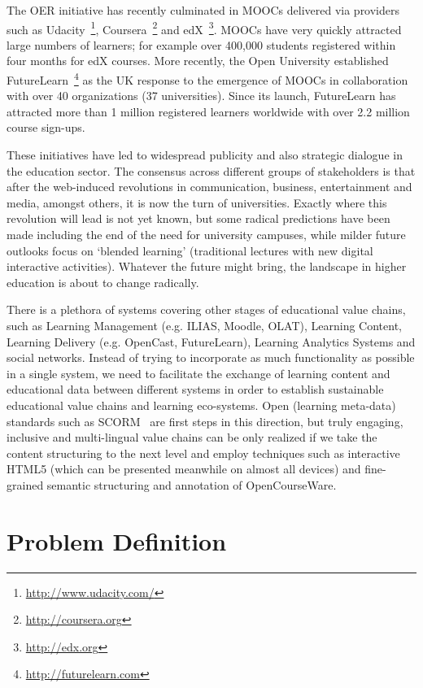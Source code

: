 \documentclass[ngerman,UKenglish,table]{scrbook}
\begin{document}
The OER initiative has recently culminated in MOOCs delivered via providers such as Udacity~\footnote{\url{http://www.udacity.com/}}, Coursera~\footnote{\url{http://coursera.org}} and edX~\footnote{\url{http://edx.org}}.
MOOCs have very quickly attracted large numbers of learners; for example over 400,000 students registered within four months for edX courses.
More recently, the Open University established FutureLearn~\footnote{\url{http://futurelearn.com}} as the UK response to the emergence of MOOCs in collaboration with over 40 organizations (37 universities).
Since its launch, FutureLearn has attracted more than 1 million registered learners worldwide with over 2.2 million course sign-ups. 

These initiatives have led to widespread publicity and also strategic dialogue in the education sector.
The consensus across different groups of stakeholders is that after the web-induced revolutions in communication, business, entertainment and media, amongst others, it is now the turn of universities.
Exactly where this revolution will lead is not yet known, but some radical predictions have been made including the end of the need for university campuses, while milder future outlooks focus on ‘blended learning’ (traditional lectures with new digital interactive activities).
Whatever the future might bring, the landscape in higher education is about to change radically.

There is a plethora of systems covering other stages of educational value chains, such as Learning Management (e.g. ILIAS, Moodle, OLAT), Learning Content, Learning Delivery (e.g. OpenCast, FutureLearn), Learning Analytics Systems and social networks.
Instead of trying to incorporate as much functionality as possible in a single system, we need to facilitate the exchange of learning content and educational data between different systems in order to establish sustainable educational value chains and learning eco-systems.
Open (learning meta-data) standards such as SCORM~\cite{scorm_specification2011} are first steps in this direction, but truly engaging, inclusive and multi-lingual value chains can be only realized if we take the content structuring to the next level and employ techniques such as interactive HTML5 (which can be presented meanwhile on almost all devices) and fine-grained semantic structuring and annotation of OpenCourseWare.


\section{Problem Definition}
\label{section:problem_definition}
\end{document}
